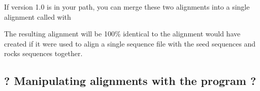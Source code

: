 If  version 1.0 is in your path, you 
can merge these two alignments into a single alignment called
 with


The resulting alignment will be 100\% identical to the alignment
 would have created if it were used to align a single
sequence file with the seed sequences and rocks sequences together.

\subsection{? Manipulating alignments with the
   program ?}

